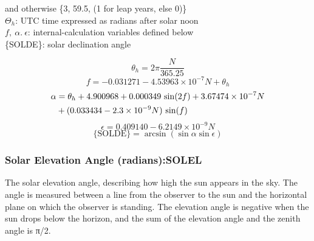 \documentclass[
  english,
]{book}
\begin{document}
\hspace*{0.333em}\hspace*{0.333em}\hspace*{0.333em}\hspace*{0.333em}\hspace*{0.333em}\hspace*{0.333em}and otherwise \{3, 59.5, (1 for leap years, else 0)\}\\
\(\Theta_h\): UTC time expressed as radians after solar noon\\
\(f,\ \alpha.\ \epsilon\): internal-calculation variables defined below\\
\{SOLDE\}: solar declination angle

\begin{equation}
\theta_{h}=2\pi\frac{N}{365.25}
\label{eq:SOLDEbox1}
\end{equation}
\begin{equation}
f=-0.031271-4.53963\times10^{-7}N+\theta_{h}
\label{eq:SOLDEbox2}
\end{equation}
\begin{align}
\alpha  &=  \theta_{h}+4.900968+0.000349\,\sin(2f)+3.67474\times10^{-7}N\notag \\
        &+(0.033434-2.3\times10^{-9}N)\,\sin(f)
\label{eq:SOLDEalpha}
\end{align}
\begin{equation}
\epsilon=0.409140-6.2149\times10^{-9}N
\label{eq:SOLDEeps}
\end{equation}
\begin{equation}
\mathrm{{\{SOLDE\}}=}\arcsin(\sin\alpha\sin\epsilon)
\label{eq:SOLDEbox}
\end{equation}

\hypertarget{solel}{%
\subsubsection*{Solar Elevation Angle (radians):SOLEL}\label{solel}}

The solar elevation angle, describing how high the sun appears in the sky. The angle is measured between a line from the observer to the sun and the horizontal plane on which the observer is standing. The elevation angle is negative when the sun drops below the horizon, and the sum of the elevation angle and the zenith angle is {π/2.}
\end{document}
